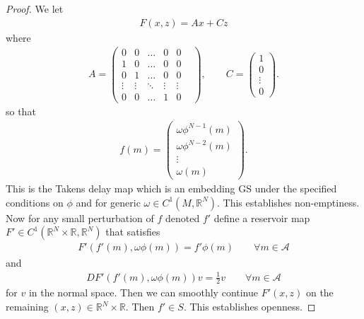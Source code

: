 \documentclass{article}
\theoremstyle{definition}
\theoremstyle{definition}
\numberwithin{theorem}{section}
\begin{document}
\begin{proof}
    We let
    \begin{align*}
        F(x,z) = Ax + Cz
    \end{align*}
    where
    \begin{align*}
        A = 
        \begin{pmatrix}
            0 & 0 & \ldots & 0 & 0 \\
            1 & 0 & \ldots & 0 & 0 \\
            0 & 1 & \ldots & 0 & 0 \\
            \vdots & \vdots & \ddots & \vdots & \vdots & \\
            0 & 0 & \ldots & 1 & 0
        \end{pmatrix},
        \qquad C = 
        \begin{pmatrix}
            1 \\
            0 \\
            \vdots \\
            0
        \end{pmatrix}.
    \end{align*}
    so that
    \begin{align*}
        f(m) = 
        \begin{pmatrix}
            \omega\phi^{N-1}(m) \\
            \omega\phi^{N-2}(m) \\
            \vdots \\
            \omega(m)
        \end{pmatrix}.
    \end{align*}
    This is the Takens delay map which is an embedding GS under the specified conditions on $\phi$ and for generic $\omega \in C^1(M,\mathbb{R}^N)$. This establishes non-emptiness. 
    Now for any small perturbation of $f$ denoted $f'$ define a reservoir map $F' \in C^1(\mathbb{R}^N \times \mathbb{R} , \mathbb{R}^N)$ that satisfies
    \begin{align*}
        F'(f'(m),\omega\phi(m)) = f'\phi(m) \qquad \forall m \in \mathcal{A}
    \end{align*}
    and 
    \begin{align*}
        DF'(f'(m),\omega\phi(m))v = \frac{1}{2} v \qquad \forall m \in \mathcal{A}
    \end{align*}
    for $v$ in the normal space. Then we can smoothly continue $F'(x,z)$ on the remaining $(x,z) \in \mathbb{R}^N \times \mathbb{R}$. Then $f' \in S$. This establishes openness. 
\end{proof}
\end{document}
